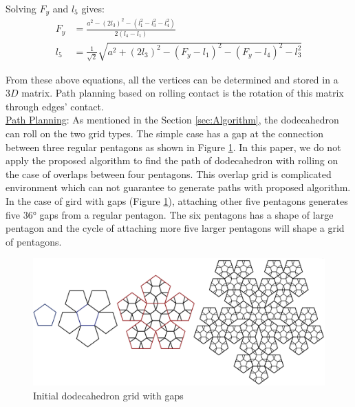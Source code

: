 \noindent Solving $F_y$ and $l_5$ gives:
\begin{equation*} 
\label{dodeca:eq3}
\begin{split}
F_y & = \frac{a^2-(2l_3)^2-(l_1^2-l_3^2-l_4^2)}{2(l_4-l_1)} \\
l_5 & = \frac{1}{\sqrt{2}}\sqrt{a^2+(2l_3)^2-(F_y-l_1)^2-(F_y-l_4)^2-l_3^2}
\end{split}
\end{equation*}

\noindent From these above equations, all the vertices can be determined and stored in a $3D$ matrix. 
Path planning based on rolling contact is the rotation of this matrix through edges' contact.\\
%
%

\noindent\uline{Path Planning}: As mentioned in the Section \ref{sec:Algorithm}, the dodecahedron can roll on the two grid types. 
The simple case has a gap at the connection between three regular pentagons as shown in Figure \ref{fig:dodecaGrid}. 
%
In this paper, we do not apply the proposed algorithm to find the path of dodecahedron with rolling on the case of overlaps between four pentagons. 
This overlap grid is complicated environment which can not guarantee to generate paths with proposed algorithm. 
%
In the case of gird with gaps (Figure \ref{fig:dodecaGrid}), attaching other five pentagons generates five $\ang{36}$ gaps from a regular pentagon. 
The six pentagons has a shape of large pentagon and the cycle of attaching more five larger pentagons will shape a grid of pentagons.\\

%
\begin{figure}[h]
\centering
	\includegraphics[width=\textwidth]{image/dodecaGrid.png}
	\caption{Initial dodecahedron grid with gaps}
	\label{fig:dodecaGrid}
\end{figure}

